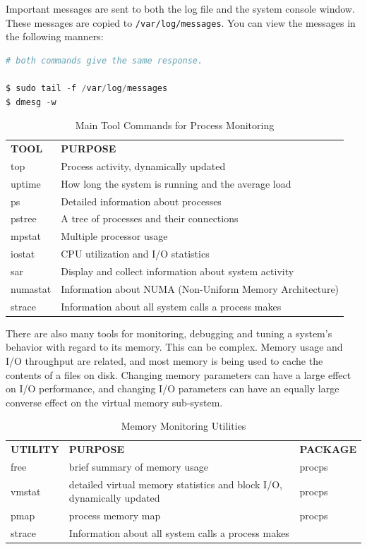 \documentclass[11pt]{article}
\begin{document}
\noindent Important messages are sent to both the log file and the system console window. These messages are copied to \texttt{/var/log/messages}. You can view the messages in the following manners:

\begin{lstlisting}[language=python]
# both commands give the same response.

$ sudo tail -f /var/log/messages
$ dmesg -w
\end{lstlisting}

\begin{table}[htbp]
\centering
\caption*{Main Tool Commands for Process Monitoring}
\begin{tabular}{ll}
\textbf{TOOL} & \textbf{PURPOSE} \\
top & Process activity, dynamically updated \\
uptime & How long the system is running and the average load \\
ps & Detailed information about processes \\
pstree & A tree of processes and their connections \\
mpstat & Multiple processor usage \\
iostat & CPU utilization and I/O statistics \\
sar & Display and collect information about system activity \\
numastat & Information about NUMA (Non-Uniform Memory Architecture) \\
strace & Information about all system calls a process makes \\
\end{tabular}
\end{table}

There are also many tools for monitoring, debugging and tuning a system's behavior with regard to its memory. This can be complex. Memory usage and I/O throughput are related, and most memory is being used to cache the contents of a files on disk. Changing memory parameters can have a large effect on I/O performance, and changing I/O parameters can have an equally large converse effect on the virtual memory sub-system.

\begin{table}[htbp]
\centering
\caption*{Memory Monitoring Utilities}
\begin{tabular}{lll}
\textbf{UTILITY} & \textbf{PURPOSE} &  \textbf{PACKAGE}\\
free & brief summary of memory usage & procps\\
vmstat & detailed virtual memory statistics and block I/O, dynamically updated & procps \\
pmap & process memory map & procps
\\
strace & Information about all system calls a process makes \\
\end{tabular}
\end{table}
\end{document}
